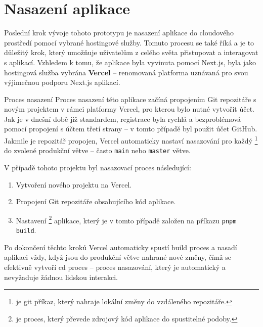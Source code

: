 \pagebreak
\section{Nasazení aplikace}
\label{sec:implementace-deployment}
Poslední krok vývoje tohoto prototypu je nasazení aplikace do cloudového prostředí pomocí vybrané hostingové služby.
Tomuto procesu se také říká  a je to důležitý krok, který umožňuje uživatelům z celého světa přistupovat a interagovat s aplikací.
Vzhledem k tomu, že aplikace byla vyvinuta pomocí Next.js, byla jako hostingová služba vybrána \textbf{Vercel} – renomovaná platforma uznávaná pro svou výjimečnou podporu Next.js aplikací\cite{vd_vercel_com_docs}.

\begin{subsection}{Proces nasazení}
    \label{subsec:implementace-proces-nasazeni}
    Proces nasazení této aplikace začíná propojením Git repozitáře s novým projektem v rámci platformy Vercel, pro kterou bylo nutné vytvořit účet.
    Jak je v dnešní době již standardem, registrace byla rychlá a bezproblémová pomocí propojení s účtem třetí strany – v tomto případě byl použit účet GitHub.
    Jakmile je repozitář propojen, Vercel automaticky nastaví nasazování pro každý \footnote{ je git příkaz, který nahraje lokální změny do vzdáleného repozitáře\cite{g_docs_git_push}.} do zvolené produkční větve – často \texttt{main} nebo \texttt{master} větve.

    V případě tohoto projektu byl nasazovací proces následující:
    \begin{enumerate}
        \item Vytvoření nového projektu na Vercel.
        \item Propojení Git repozitáře obsahujícího kód aplikace.
        \item Nastavení \footnote{ je proces, který převede zdrojový kód aplikace do spustitelné podoby.} aplikace, který je v tomto případě založen na příkazu \texttt{pnpm build}.
    \end{enumerate}

    Po dokončení těchto kroků Vercel automaticky spustí build proces a nasadí aplikaci vždy, když jsou do produkční větve nahrané nové změny, čímž se efektivně vytvoří \ac{cd} proces – proces nasazování, který je automatický a nevyžaduje žádnou lidskou interakci.
\end{subsection}

